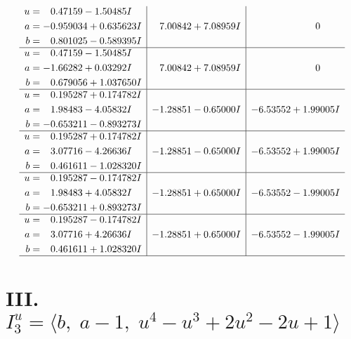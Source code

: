 \documentclass[1p]{elsarticle_modified}
\theoremstyle{definition}
\begin{document}
$$\begin{array}{c|c|c}
\begin{aligned}
u &= \phantom{-}0.47159 - 1.50485 I \\
a &= -0.959034 + 0.635623 I \\
b &= \phantom{-}0.801025 - 0.589395 I\end{aligned}
 & \phantom{-}7.00842 + 7.08959 I & \phantom{-0.000000 } 0 \\ \hline\begin{aligned}
u &= \phantom{-}0.47159 - 1.50485 I \\
a &= -1.66282 + 0.03292 I \\
b &= \phantom{-}0.679056 + 1.037650 I\end{aligned}
 & \phantom{-}7.00842 + 7.08959 I & \phantom{-0.000000 } 0 \\ \hline\begin{aligned}
u &= \phantom{-}0.195287 + 0.174782 I \\
a &= \phantom{-}1.98483 - 4.05832 I \\
b &= -0.653211 - 0.893273 I\end{aligned}
 & -1.28851 - 0.65000 I & -6.53552 + 1.99005 I \\ \hline\begin{aligned}
u &= \phantom{-}0.195287 + 0.174782 I \\
a &= \phantom{-}3.07716 - 4.26636 I \\
b &= \phantom{-}0.461611 - 1.028320 I\end{aligned}
 & -1.28851 - 0.65000 I & -6.53552 + 1.99005 I \\ \hline\begin{aligned}
u &= \phantom{-}0.195287 - 0.174782 I \\
a &= \phantom{-}1.98483 + 4.05832 I \\
b &= -0.653211 + 0.893273 I\end{aligned}
 & -1.28851 + 0.65000 I & -6.53552 - 1.99005 I \\ \hline\begin{aligned}
u &= \phantom{-}0.195287 - 0.174782 I \\
a &= \phantom{-}3.07716 + 4.26636 I \\
b &= \phantom{-}0.461611 + 1.028320 I\end{aligned}
 & -1.28851 + 0.65000 I & -6.53552 - 1.99005 I\\
 \hline 
 \end{array}$$\newpage\newpage\renewcommand{\arraystretch}{1}
\centering \section*{III. $I^u_{3}= \langle b,\;a-1,\;u^4- u^3+2 u^2-2 u+1 \rangle$}
\end{document}
